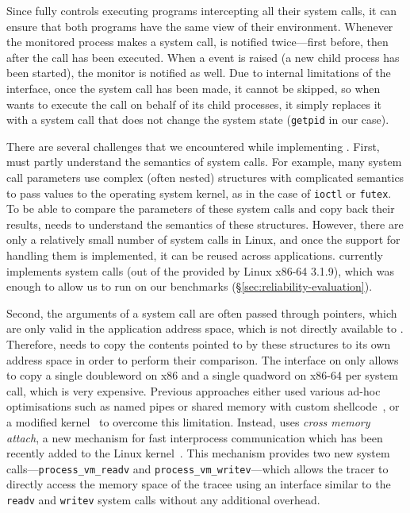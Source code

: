 Since \mxm fully controls executing programs intercepting all their system
calls, it can ensure that both programs have the same view of their
environment. Whenever the monitored process makes a system call, \mxm is
notified twice---first before, then after the call has been executed.  When a
\ptrace event is raised (\eg a new child process has been started), the monitor
is notified as well.  Due to internal limitations of the \ptrace interface,
once the system call has been made, it cannot be skipped, so when \mxm wants to
execute the call on behalf of its child processes, it simply replaces it with a
system call that does not change the system state (\lstinline`getpid` in our
case).

There are several challenges that we encountered while implementing
\mxm.  First, \mxm must partly understand the semantics of 
system calls.  For example, many system call parameters use complex
(often nested) structures with complicated semantics to pass values to
the operating system kernel, as in the case of \lstinline`ioctl` or
\lstinline`futex`.  To be able to compare the parameters of
these system calls and copy back their results, \mxm needs to
understand the semantics of these structures.  However, there are only
a relatively small number of system calls in Linux, and once the support
for handling them is implemented, it can be reused across applications.
\mxm currently implements \syscallsImplemented system calls (out of the
\syscallsTotal provided by Linux x86-64 3.1.9), which was enough to
allow us to run \mx on our benchmarks
(\S\ref{sec:reliability-evaluation}).

Second, the arguments of a system call are often passed through pointers,
which are only valid in the application address space, which is not directly
available to \mxm.  Therefore, \mxm needs to copy the contents pointed to by
these structures to its own address space in order to perform their
comparison.  The \ptrace interface on only allows to copy a single doubleword
on x86 and a single quadword on x86-64 per system call, which is very
expensive. Previous approaches either used various ad-hoc optimisations such as
named pipes or shared memory with custom shellcode~\cite{orchestra09}, or a
modified kernel~\cite{tachyon12} to overcome this limitation. Instead, \mxm
uses \emph{cross memory attach}, a new mechanism for fast interprocess
communication which has been recently added to the Linux
kernel~\cite{crossmemoryattach}.  This mechanism provides two new system
calls---\lstinline`process_vm_readv` and \lstinline`process_vm_writev`---which
allows the tracer to directly access the memory space of the tracee using an
interface similar to the \lstinline`readv` and \lstinline`writev` system calls
without any additional overhead.


